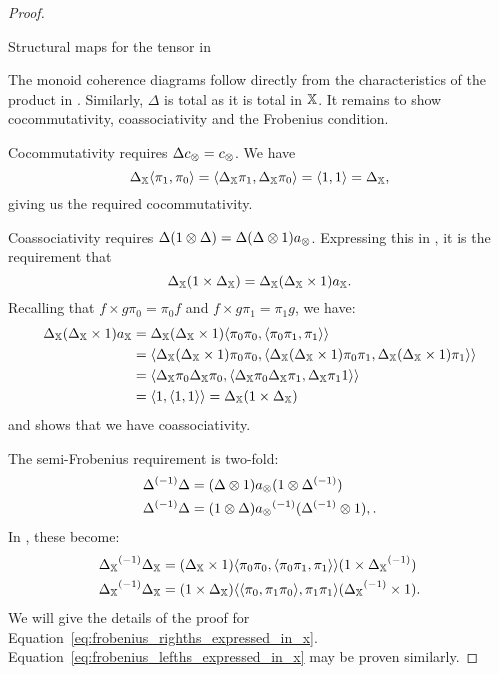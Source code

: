 \begin{proof}
\begin{table}[!htbp]
\begin{center}
    \end{center}
    \caption{Structural maps for the tensor in \Invc{\X}}
    \label{tab:structural_maps_for_the_tensor_in_invx}
  \end{table}

  The monoid coherence diagrams follow directly from the characteristics of the product in
  \X. Similarly, $\Delta$ is total as it is total in $\mathbb{X}$. It remains to show cocommutativity,
  coassociativity and the Frobenius condition.

  Cocommutativity requires $\Delta c_{\otimes} = c_{\otimes}$. We have
  \[
     \Delta_{\mathbb{X}} \langle \pi_1,\pi_0\rangle = \langle\Delta_{\mathbb{X}}\pi_1, \Delta_{\mathbb{X}}\pi_0\rangle = \langle1,1\rangle =
     \Delta_{\mathbb{X}},
  \]
  giving us the required cocommutativity.

  Coassociativity requires $\Delta (1 \otimes \Delta) = \Delta (\Delta \otimes 1) a_{\otimes}$. Expressing this
  in \X, it is the requirement that
  \[
    \Delta_{\mathbb{X}} (1 \times \Delta_{\mathbb{X}}) =
      \Delta_{\mathbb{X}}(\Delta_{\mathbb{X}} \times 1) a_{\mathbb{X}}.
  \]
  Recalling that $f\times g \pi_0 = \pi_0 f$ and $f\times g \pi_1 = \pi_1 g$, we have:
  \begin{align*}
    \Delta_{\mathbb{X}}(\Delta_{\mathbb{X}} \times 1) a_{\mathbb{X}} &=\Delta_{\mathbb{X}}(\Delta_{\mathbb{X}} \times 1)
    \langle\pi_0\pi_0,\langle\pi_0\pi_1,\pi_1\rangle\rangle\\
    &= \langle\Delta_{\mathbb{X}}(\Delta_{\mathbb{X}} \times 1)\pi_0\pi_0,\langle\Delta_{\mathbb{X}}(\Delta_{\mathbb{X}} \times 1)\pi_0\pi_1,\Delta_{\mathbb{X}}(\Delta_{\mathbb{X}} \times 1)\pi_1\rangle\rangle\\
    &= \langle\Delta_{\mathbb{X}}\pi_0\Delta_{\mathbb{X}}\pi_0,\langle\Delta_{\mathbb{X}}\pi_0\Delta_{\mathbb{X}}\pi_1,\Delta_{\mathbb{X}}\pi_1 1\rangle\rangle\\
    &= \langle1, \langle1,1\rangle\rangle = \Delta_{\mathbb{X}}(1\times\Delta_{\mathbb{X}})
  \end{align*}
  and shows that we have coassociativity.

  The semi-Frobenius requirement is two-fold:
  \begin{align}
    {\Delta}^{(-1)} \Delta &= (\Delta \otimes1) a_{\otimes}(1\otimes{\Delta}^{(-1)}) \label{eq:frobenius_righths_need_in_invx}\\
    {\Delta}^{(-1)} \Delta &= (1 \otimes \Delta) {a_{\otimes}}^{(-1)}({\Delta}^{(-1)}\otimes 1), \label{eq:frobenius_lefths_need_in_invx}.
  \end{align}
  In \X, these become:
  \begin{align}
    {\Delta_{\ensuremath{\mathbb{X}}}}^{(-1)} \Delta_{\mathbb{X}}
      &= (\Delta_{\mathbb{X}} \times 1) \langle\pi_0 \pi_0,\langle\pi_0 \pi_1,\pi_1\rangle\rangle(1\times{\Delta_{\ensuremath{\mathbb{X}}}}^{(-1)})
      \label{eq:frobenius_righths_expressed_in_x}\\
    {\Delta_{\mathbb{X}}}^{(-1)}\Delta_{\mathbb{X}}
      &= (1 \times \Delta_{\mathbb{X}}) \langle\langle\pi_0, \pi_1 \pi_0\rangle,\pi_1 \pi_1\rangle({\Delta_{\mathbb{X}}}^{(-1)}\times 1).
      \label{eq:frobenius_lefths_expressed_in_x}
  \end{align}
  We will give the details of the proof for Equation~\ref{eq:frobenius_righths_expressed_in_x}.
  Equation~\ref{eq:frobenius_lefths_expressed_in_x} may be proven similarly.


\end{proof}
